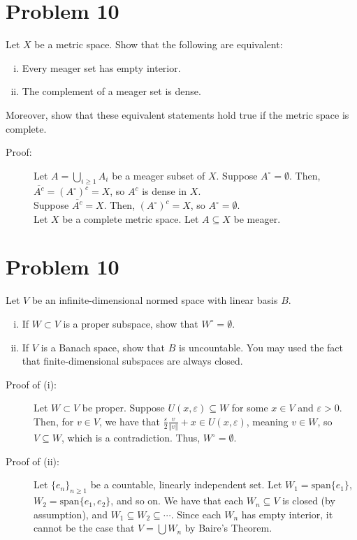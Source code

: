 \documentclass[10pt]{extarticle}
\newcommand{\norm}[1]{\left\Vert #1\right\Vert}
\begin{document}
  \section{Problem 10}%
  Let $X$ be a metric space. Show that the following are equivalent:
  \begin{enumerate}[(i)]
    \item Every meager set has empty interior.
    \item The complement of a meager set is dense.
  \end{enumerate}
  Moreover, show that these equivalent statements hold true if the metric space is complete.
  \begin{description}
    \item[Proof:] Let $A = \bigcup_{i\geq 1}A_i$ be a meager subset of $X$. Suppose $A^{\circ} = \emptyset$. Then, $\overline{A^{c}} = \left(A^{\circ}\right)^{c} = X$, so $A^{c}$ is dense in $X$.\\

      Suppose $\overline{A^{c}} = X$. Then, $\left(A^{\circ}\right)^{c} = X$, so $A^{\circ} = \emptyset$.\\

      Let $X$ be a complete metric space. Let $A\subseteq X$ be meager. 
  \end{description}
  \section{Problem 10}%
  Let $V$ be an infinite-dimensional normed space with linear basis $B$.
  \begin{enumerate}[(i)]
    \item If $W\subset V$ is a proper subspace, show that $W^{\circ} = \emptyset$.
    \item If $V$ is a Banach space, show that $B$ is uncountable. You may used the fact that finite-dimensional subspaces are always closed.
  \end{enumerate}
  \begin{description}
    \item[Proof of (i):] Let $W\subset V$ be proper. Suppose $U(x,\varepsilon) \subseteq W$ for some $x\in V$ and $\varepsilon > 0$. Then, for $v\in V$, we have that $\frac{\varepsilon}{2}\frac{v}{\norm{v}} + x \in U(x,\varepsilon)$, meaning $v \in W$, so $V\subseteq W$, which is a contradiction. Thus, $W^{\circ} = \emptyset$.
    \item[Proof of (ii):] Let $\{e_n\}_{n\geq 1}$ be a countable, linearly independent set. Let $W_1 = \text{span}\{e_1\}$, $W_2 = \text{span}\{e_1,e_2\}$, and so on. We have that each $W_n\subseteq V$ is closed (by assumption), and $W_1\subseteq W_2\subseteq \cdots $. Since each $W_n$ has empty interior, it cannot be the case that $V = \bigcup W_n$ by Baire's Theorem.
  \end{description}
\end{document}
